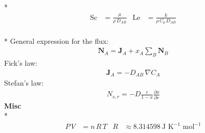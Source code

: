 \begin{datasheet}
\\*
\begin{align*}
  \text{Sc} &= \frac{\mu}{\rho\,D_{AB}} & \text{Le} &= \frac{k}{\rho\,C_p\,D_{AB}}
\end{align*}
\\*
General expression for the flux:
\begin{align*}
  \bm{N}_{A} = \bm{J}_A + x_A \sum_B \bm{N}_B
\end{align*}
Fick's law:
\begin{align*}
  \bm{J}_{A} = - D_{AB}\,\nabla C_A
\end{align*}
Stefan's law:
\begin{align*}
  N_{s,r} = -D \frac{c}{1-x}\frac{\partial x}{\partial r}
\end{align*}
{\bf Misc}\\*
\begin{align*}
  P\,V &= n\,R\,T & 
  R&\approx8.314598~\text{J K}^{-1}\text{ mol}^{-1} 
\end{align*}
\end{datasheet}
